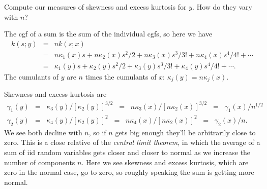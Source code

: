 \documentclass[11pt]{exam}
\begin{document}
\begin{questions}
\begin{parts}
\item  Compute our measures of skewness and excess kurtosis for
$y$.  How do they vary with $n$?
\end{parts}

\begin{solution}
\begin{parts}
\item The cgf of a sum is the sum of the individual cgfs, so here we have
\begin{eqnarray*}
    k(s; y) &=& n k(s; x) \\
        &=& n \kappa_1(x) s + n\kappa_2(x) s^2/2 + n\kappa_3(x) s^3/3! + n\kappa_4(x) s^4/4! + \cdots \\
        &=& \kappa_1(y) s + \kappa_2(y) s^2/2 + \kappa_3(y) s^3/3! + \kappa_4(y) s^4/4! + \cdots .
\end{eqnarray*}
The cumulants of $y$ are $n$ times the cumulants of $x$:  $\kappa_j (y) = n\kappa_j (x) $.

\item Skewness and excess kurtosis are
\begin{eqnarray*}
    \gamma_1(y) &=& \kappa_3(y)/[\kappa_2(y)]^{3/2}
            \;\;=\;\;  n\kappa_3(x)/[n\kappa_2(x)]^{3/2}
            \;\;=\;\; \gamma_1(x)/n^{1/2} \\
    \gamma_2(y) &=& \kappa_4(y)/[\kappa_2(y)]^{2}
            \;\;=\;\; n\kappa_4(x)/[n\kappa_2(x)]^{2}
            \;\;=\;\; \gamma_2(x)/n .
\end{eqnarray*}
We see both decline with $n$, so if $n$ gets big enough they'll be arbitrarily close to zero.
This is a close relative of the {\it central limit theorem\/}, in which the average
of a sum of iid random variables gets closer and closer to normal as we increase the number
of components $n$.
Here we see skewness and excess kurtosis, which are zero in the normal case,
go to zero, so roughly speaking the sum is getting more normal.

\end{parts}
\end{solution}

\end{questions}



\end{document}

